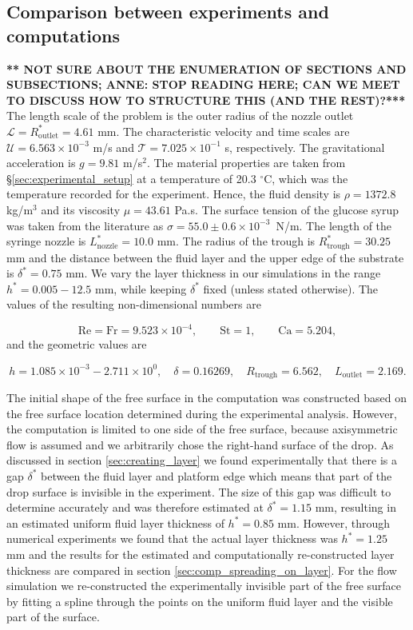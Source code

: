 \documentclass[aip,graphicx]{revtex4-1}
\newcommand{\sym}[1]{\text{#1}} \newcommand{\dif}{\mathrm{d}}
\begin{document}
\subsection{Comparison between experiments and computations}
{\bf *** NOT SURE ABOUT THE ENUMERATION OF SECTIONS AND SUBSECTIONS; 
ANNE: STOP READING HERE; CAN WE MEET TO DISCUSS HOW TO STRUCTURE
THIS (AND THE REST)?***}
The length scale of the problem is the outer radius of the nozzle
outlet $\mathcal{L}=R_{\sym{outlet}}^*=4.61$ mm.
The characteristic velocity and time scales are $\mathcal{U}=6.563
\times 10^{-3}$ m/s and $\mathcal{T}=7.025 \times 10^{-1}$ s,
respectively.
The gravitational acceleration is $g=9.81$ m/s$^2$.
The material properties are taken from \S \ref{sec:experimental_setup}
at a temperature of 20.3 $^{\circ}$C, which was the temperature
recorded for the experiment.
Hence, the fluid density is $\rho=1372.8$ kg/m$^3$ and its viscosity $\mu=43.61$
Pa.s.
The surface tension of the glucose syrup was taken from the 
literature \cite{montanez2013influence} as $\sigma=55.0 \pm 0.6 \times
10^{-3}$~N/m.
The length of the syringe nozzle is $L_{\sym{nozzle}}^*=10.0$ mm.
The radius of the trough is $R_{\sym{trough}}^*=30.25$ mm and the
distance between the fluid layer and the upper edge of the substrate
is $\delta^*=0.75$ mm.
We vary the layer thickness in our simulations in the range $h^*=0.005
- 12.5$ mm, while keeping $\delta^*$ fixed (unless stated otherwise).
The values of the resulting non-dimensional numbers are

\begin{equation}
 \sym{Re} = \sym{Fr} = 9.523 \times 10^{-4}, \qquad \sym{St}=1, \qquad
 \sym{Ca}=5.204,
\end{equation}
and the geometric values are

\begin{equation}
 h = 1.085 \times 10^{-3} - 2.711 \times 10^{0}, \quad \delta=0.16269, \quad R_{\sym{trough}}=6.562, \quad
 L_{\sym{outlet}}=2.169.
\end{equation}


The initial shape of the free surface in the computation was
constructed based on
the free surface location determined during the experimental analysis.
However, the computation is limited to one side of the free surface,
because axisymmetric flow is assumed and we arbitrarily chose the
right-hand surface of the drop.  As discussed in section
\ref{sec:creating_layer} we found experimentally that there is a gap
$\delta^*$ between the fluid layer and platform edge which means that
part of the drop surface is invisible in the experiment.  The size of this gap was
difficult to determine accurately and was therefore estimated at
$\delta^*=1.15$ mm, resulting in an estimated uniform fluid layer
thickness of $h^*=0.85$ mm.  However, through numerical experiments we
found that the actual layer thickness was $h^*=1.25$ mm and the
results for the estimated and computationally re-constructed layer
thickness are compared in section \ref{sec:comp_spreading_on_layer}.
For the flow simulation we re-constructed the experimentally invisible
part of the free surface by fitting a spline through the points on the
uniform fluid layer and the visible part of the surface.
\end{document}
